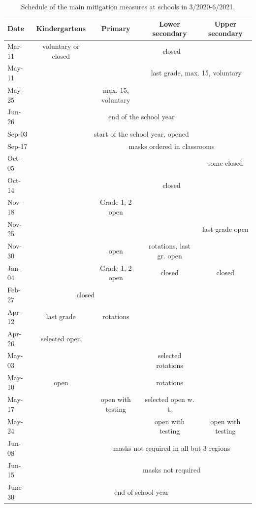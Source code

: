 \documentclass[fleqn,10pt]{wlscirep}
\begin{document}
\begin{table}
\begin{center}
\tiny
\begin{tabular}{l|c|c|c|c}
Date	&	Kindergartens		&	Primary	&	Lower secondary	&	Upper secondary \\
\hline
Mar-11	& voluntary	or closed & \multicolumn{3}{c}{closed}\\
May-11	& & &  \multicolumn{2}{c}{last grade, max. 15, voluntary} \\
May-25    &  & max. 15, voluntary & &  \\
Jun-26	&	\multicolumn{4}{c}{end of the school year} \\
Sep-03	&	\multicolumn{4}{c}{start of the school year, opened} \\
Sep-17	&	  & \multicolumn{3}{c}{masks ordered in classrooms} \\
Oct-05	&  & & & some closed \\
Oct-14	&  & \multicolumn{3}{c}{closed} \\
Nov-18	&  &  Grade 1, 2 open &  &  \\
Nov-25	&  &  & & last grade open \\
Nov-30  & & open & rotations, last gr. open & \\
Jan-04	&  & Grade 1, 2 open &  closed & closed \\
Feb-27	&    \multicolumn{2}{c}{closed}  & \, & \\
Apr-12  & last grade & rotations & &  \\
Apr-26  &  selected open & & &  \\
May-03  &  & & selected rotations &  \\
May-10  & open & & rotations & \\
May-17  & & open with testing & selected open w. t. & \\
May-24 & & & open with testing & open with testing \\
Jun-08 &  & \multicolumn{3}{c}{masks not required in all but 3 regions} \\
Jun-15 &  & \multicolumn{3}{c}{masks not required} \\
June-30 & \multicolumn{4}{c}{end of school year}
\end{tabular}
\caption{Schedule of the main mitigation measures at schools in 3/2020-6/2021. 
}
\label{tab:measures}
\end{center}
\end{table}
\end{document}
